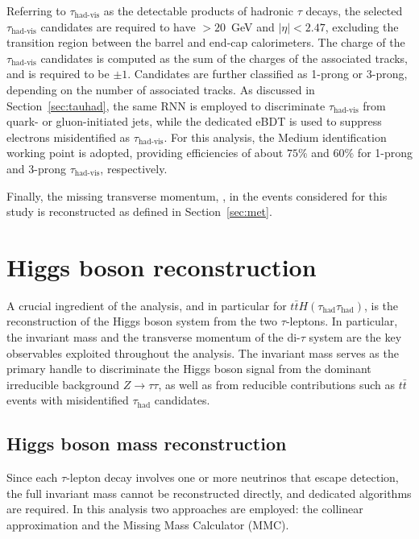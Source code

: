 Referring to $\tau_{\text{had-vis}}$ as the detectable products of hadronic $\tau$ decays, the selected $\tau_{\text{had-vis}}$ candidates are required to have \pt$ > 20$~GeV and $|\eta| < 2.47$, excluding the transition region between the barrel and end-cap calorimeters. The charge of the $\tau_{\text{had-vis}}$ candidates is computed as the sum of the charges of the associated tracks, and is required to be $\pm 1$. Candidates are further classified as 1-prong or 3-prong, depending on the number of associated tracks. As discussed in Section~\ref{sec:tauhad}, the same RNN is employed to discriminate $\tau_{\text{had-vis}}$ from quark- or gluon-initiated jets, while the dedicated eBDT is used to suppress electrons misidentified as $\tau_{\text{had-vis}}$. For this analysis, the Medium identification working point is adopted, providing efficiencies of about $75\%$ and $60\%$ for 1-prong and 3-prong $\tau_{\text{had-vis}}$, respectively.  

Finally, the missing transverse momentum, \etmiss, in the events considered for this study is reconstructed as defined in Section~\ref{sec:met}.

\section{Higgs boson reconstruction}
\label{sec:higgs_reconstruction}

A crucial ingredient of the \htautau analysis, and in particular for $t\bar{t}H(\tau_{\text{had}}\tau_{\text{had}})$, is the reconstruction of the Higgs boson system from the two $\tau$-leptons. In particular, the invariant mass and the transverse momentum of the di-$\tau$ system are the key observables exploited throughout the analysis. The invariant mass serves as the primary handle to discriminate the Higgs boson signal from the dominant irreducible background $Z\to\tau\tau$, as well as from reducible contributions such as $t\bar{t}$ events with misidentified $\tau_{\text{had}}$ candidates. 

\subsection{Higgs boson mass reconstruction}
\label{subsec:higgs_mass}

Since each $\tau$-lepton decay involves one or more neutrinos that escape detection, the full invariant mass cannot be reconstructed directly, and dedicated algorithms are required. In this analysis two approaches are employed: the collinear approximation and the Missing Mass Calculator (MMC).  

